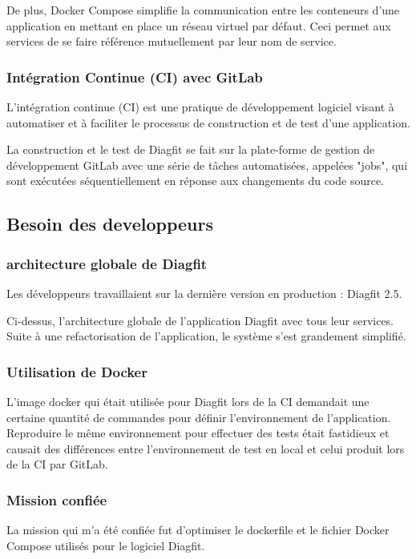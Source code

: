 De plus, Docker Compose simplifie la communication entre les conteneurs d'une application en mettant en place un réseau virtuel par défaut. Ceci permet aux services de se faire référence mutuellement par leur nom de service.

\subsubsection{Intégration Continue (CI) avec GitLab}
L'intégration continue (CI) est une pratique de développement logiciel visant à automatiser et à faciliter le processus de construction et de test d'une application.

La construction et le test de Diagfit se fait sur la plate-forme de gestion de développement GitLab avec une série de tâches automatisées, appelées "jobs", qui sont exécutées séquentiellement en réponse aux changements du code source.


\subsection{Besoin des developpeurs}
\subsubsection{architecture globale de Diagfit}
Les développeurs travaillaient sur la dernière version en production : Diagfit 2.5.


Ci-dessus, l'architecture globale de l'application Diagfit avec tous leur services.
Suite à une refactorisation de l'application, le système s'est grandement simplifié.


\subsubsection{Utilisation de Docker}
L'image docker qui était utilisée pour Diagfit lors de la CI demandait une certaine quantité de commandes pour définir l'environnement de l'application.
Reproduire le même environnement pour effectuer des tests était fastidieux et causait des différences entre l'environnement de test en local et celui produit lors de la CI par GitLab.

\subsubsection{Mission confiée}
La mission qui m'a été confiée fut d'optimiser le dockerfile et le fichier Docker Compose utilisés pour le logiciel Diagfit.

